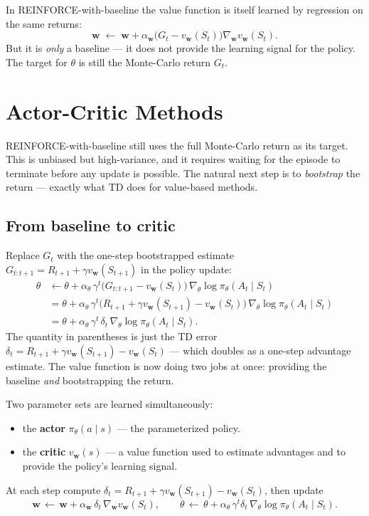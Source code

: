 \documentclass[11pt, oneside]{book}
\begin{document}
In REINFORCE-with-baseline the value function is itself learned by regression on
the same returns:
\[
  \mathbf{w} \;\leftarrow\; \mathbf{w} + \alpha_\mathbf{w}\bigl(G_t - v_\mathbf{w}(S_t)\bigr)\nabla_\mathbf{w} v_\mathbf{w}(S_t).
\]
But it is \emph{only} a baseline --- it does not provide the learning signal for the
policy.
The target for $\theta$ is still the Monte-Carlo return $G_t$.

\section{Actor-Critic Methods}

REINFORCE-with-baseline still uses the full Monte-Carlo return as its target.
This is unbiased but high-variance, and it requires waiting for the episode to
terminate before any update is possible.
The natural next step is to \emph{bootstrap} the return --- exactly what TD does for
value-based methods.

\subsection{From baseline to critic}

Replace $G_t$ with the one-step bootstrapped estimate
$G_{t:t+1} = R_{t+1} + \gamma v_\mathbf{w}(S_{t+1})$ in the policy update:
\begin{align*}
  \theta &\leftarrow \theta + \alpha_\theta\, \gamma^t\bigl(G_{t:t+1} - v_\mathbf{w}(S_t)\bigr)\, \nabla_\theta \log \pi_\theta(A_t \mid S_t) \\
         &= \theta + \alpha_\theta\, \gamma^t\bigl(R_{t+1} + \gamma v_\mathbf{w}(S_{t+1}) - v_\mathbf{w}(S_t)\bigr)\, \nabla_\theta \log \pi_\theta(A_t \mid S_t) \\
         &= \theta + \alpha_\theta\, \gamma^t\, \delta_t\, \nabla_\theta \log \pi_\theta(A_t \mid S_t).
\end{align*}
The quantity in parentheses is just the TD error
$\delta_t = R_{t+1} + \gamma v_\mathbf{w}(S_{t+1}) - v_\mathbf{w}(S_t)$ --- which doubles
as a one-step advantage estimate.
The value function is now doing two jobs at once: providing the baseline \emph{and}
bootstrapping the return.

\begin{defbox}[title={Actor-Critic (One-Step)}]
Two parameter sets are learned simultaneously:
\begin{itemize}
  \item the \textbf{actor} $\pi_\theta(a \mid s)$ --- the parameterized policy.
  \item the \textbf{critic} $v_\mathbf{w}(s)$ --- a value function used to estimate
    advantages and to provide the policy's learning signal.
\end{itemize}
At each step compute
$\delta_t = R_{t+1} + \gamma v_\mathbf{w}(S_{t+1}) - v_\mathbf{w}(S_t)$, then update
\[
  \mathbf{w} \,\leftarrow\, \mathbf{w} + \alpha_\mathbf{w}\, \delta_t\, \nabla_\mathbf{w} v_\mathbf{w}(S_t),
  \qquad
  \theta \,\leftarrow\, \theta + \alpha_\theta\, \gamma^t \delta_t\, \nabla_\theta \log \pi_\theta(A_t \mid S_t).
\]
\end{defbox}
\end{document}

